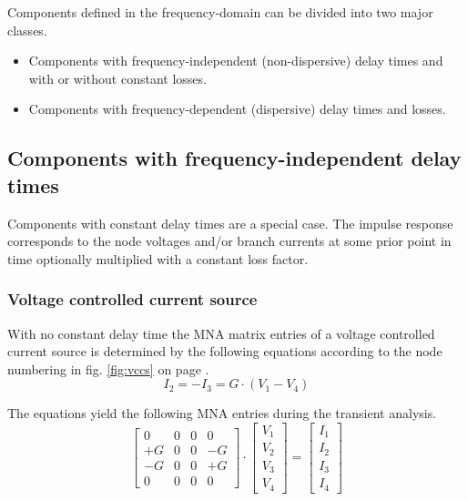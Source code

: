 Components defined in the frequency-domain can be divided into two
major classes.

\begin{itemize}
\item Components with frequency-independent (non-dispersive) delay
times and with or without constant losses.
\item Components with frequency-dependent (dispersive) delay times and
losses.
\end{itemize}

\subsection{Components with frequency-independent delay times}

Components with constant delay times are a special case.  The impulse
response corresponds to the node voltages and/or branch currents at
some prior point in time optionally multiplied with a constant loss
factor.

\subsubsection{Voltage controlled current source}

With no constant delay time the MNA matrix entries of a voltage
controlled current source is determined by the following equations
according to the node numbering in fig. \ref{fig:vccs} on page
\pageref{fig:vccs}.
\begin{equation}
\label{eq:vccs_dc}
I_2 = -I_3 = G\cdot \left(V_1 - V_4\right)
\end{equation}

The equations yield the following MNA entries during the transient
analysis.
\begin{equation}
\begin{bmatrix}
0 & 0 & 0 & 0\\
+G & 0 & 0 & -G\\
-G & 0 & 0 & +G\\
0 & 0 & 0 & 0
\end{bmatrix}
\cdot
\begin{bmatrix}
V_1\\
V_2\\
V_3\\
V_4
\end{bmatrix}
=
\begin{bmatrix}
I_1\\
I_2\\
I_3\\
I_4
\end{bmatrix}
\end{equation}

